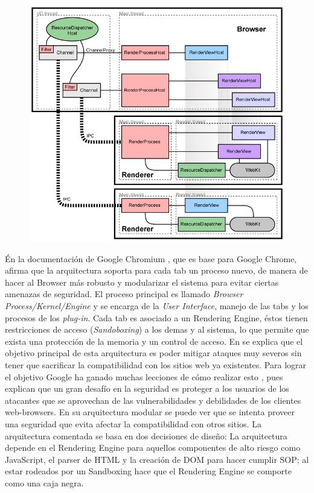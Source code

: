     \begin{figure}[h!t]
        \begin{center}
            \includegraphics[scale=0.5]{figures/archGC.jpg}
          \label{fig:archG}
        \end{center}
    \end{figure}

    Én la documentación de Google Chromium \cite{multiProcArchG}, que es base para Google Chrome, afirma que la arquitectura soporta para cada tab un proceso nuevo, de manera de hacer al Browser más robusto y modularizar el sistema para evitar ciertas amenazas de seguridad. El proceso principal es llamado \textit{Browser Process/Kernel/Engine} y se encarga de la \textit{User Interface}, manejo de las tabs y los procesos de los \textit{plug-in}. Cada tab es asociado a un Rendering Engine, éstos tienen restricciones de acceso (\textit{Sandoboxing}) a los demas y al sistema, lo que permite que exista una protección de la memoria y un control de acceso. En \cite{barth2008security} se explica que el objetivo principal de esta arquitectura es poder mitigar ataques muy severos sin tener que sacrificar la compatibilidad con los sitios web ya existentes. Para lograr el objetivo Google ha ganado muchas lecciones de cómo realizar esto \cite{reis2009browser}, pues explican que un gran desafío en la seguridad es proteger a los usuarios de los atacantes que se aprovechan de las vulnerabilidades y debilidades de los clientes web-browsers. En su arquitectura modular se puede ver que se intenta proveer una seguridad que evita afectar la compatibilidad con otros sitios. La arquitectura comentada se basa en dos decisiones de diseño: La arquitectura depende en el Rendering Engine para aquellos componentes de alto riesgo como JavaScript, el parser de HTML y la creación de DOM para hacer cumplir SOP; al estar rodeados por un Sandboxing hace que el Rendering Engine se comporte como una caja negra. 


